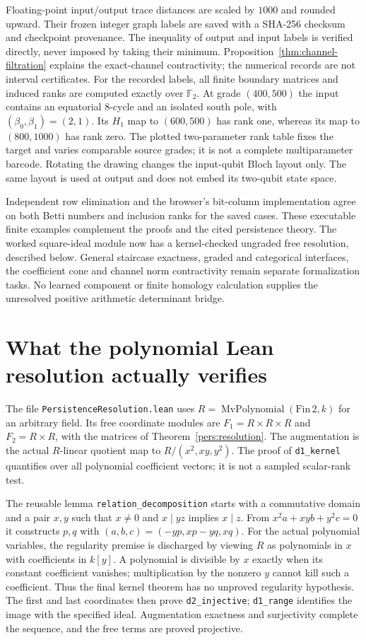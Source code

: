 \documentclass[11pt,oneside,openany]{book}
\theoremstyle{definition}\newtheorem{definition}[theorem]{Definition}
\theoremstyle{remark}\newtheorem{remark}[theorem]{Remark}
\begin{document}
Floating-point input/output trace distances are scaled by $1000$ and
rounded upward. Their frozen integer graph labels are saved with a SHA-256
checksum and checkpoint provenance. The inequality of output and input
labels is verified directly, never imposed by taking their minimum.
Proposition~\ref{thm:channel-filtration} explains the exact-channel contractivity;
the numerical records are not interval certificates. For the recorded labels,
all finite boundary matrices and induced ranks are computed exactly over
$\mathbb F_2$. At grade $(400,500)$ the input contains an equatorial
8-cycle and an isolated south pole, with $(\beta_0,\beta_1)=(2,1)$.
Its $H_1$ map to $(600,500)$ has rank one, whereas its map to $(800,1000)$
has rank zero. The plotted two-parameter rank table fixes the target and
varies comparable source grades; it is not a complete multiparameter barcode.
Rotating the drawing changes the input-qubit Bloch layout only. The same
layout is used at output and does not embed its two-qubit state space.

Independent row elimination and the browser's bit-column implementation
agree on both Betti numbers and inclusion ranks for the saved cases.
These executable finite examples complement the proofs and the cited
persistence theory. The worked square-ideal module now has a kernel-checked ungraded
free resolution, described below. General staircase exactness, graded and
categorical interfaces, the coefficient cone and channel norm contractivity
remain separate formalization tasks. No learned
component or finite homology calculation supplies the unresolved positive
arithmetic determinant bridge.

\section{What the polynomial Lean resolution actually verifies}
The file \texttt{PersistenceResolution.lean} uses
$R=\operatorname{MvPolynomial}(\mathrm{Fin}\,2,k)$ for an arbitrary field.
Its free coordinate modules are $F_1=R\times R\times R$ and
$F_2=R\times R$, with the matrices of Theorem~\ref{pers:resolution}.
The augmentation is the actual $R$-linear quotient map to
$R/(x^2,xy,y^2)$. The proof of \texttt{d1\_kernel} quantifies over
all polynomial coefficient vectors; it is not a sampled scalar-rank test.

The reusable lemma \texttt{relation\_decomposition} starts with a
commutative domain and a pair $x,y$ such that $x\ne0$ and
$x\mid yz$ implies $x\mid z$. From
$x^2a+xyb+y^2c=0$ it constructs $p,q$ with
$(a,b,c)=(-yp,xp-yq,xq)$. For the actual polynomial variables, the
regularity premise is discharged by viewing $R$ as polynomials in $x$
with coefficients in $k[y]$. A polynomial is divisible by $x$ exactly
when its constant coefficient vanishes; multiplication by the nonzero
$y$ cannot kill such a coefficient. Thus the final kernel theorem has
no unproved regularity hypothesis. The first and last coordinates then
prove \texttt{d2\_injective}; \texttt{d1\_range} identifies the image
with the specified ideal. Augmentation exactness and surjectivity complete
the sequence, and the free terms are proved projective.
\end{document}
